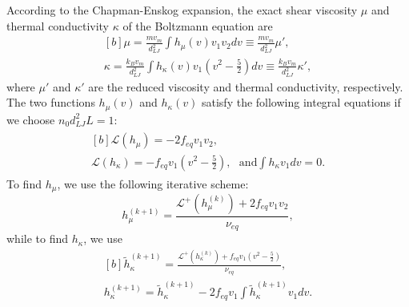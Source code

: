 According to the Chapman-Enskog expansion, the exact shear viscosity $\mu$ and thermal conductivity $\kappa$ of the Boltzmann equation are 
\begin{equation}
\begin{aligned}[b]
\mu=\frac{mv_m}{d_{LJ}^2}\int h_\mu(v)v_1v_2dv\equiv\frac{mv_m}{d_{LJ}^2}\mu',\\
\kappa=\frac{k_Bv_m}{d_{LJ}^2}\int h_\kappa(v)v_1\left(v^2-\frac{5}{2}\right)dv\equiv\frac{k_Bv_m}{d_{LJ}^2}\kappa',
\end{aligned}
\end{equation}
where $\mu'$ and $\kappa'$ are the reduced viscosity and thermal conductivity, respectively. The two functions $h_\mu(v)$ and $h_\kappa(v)$ satisfy the following integral equations if we choose $n_0d_{LJ}^2L=1$:
\begin{eqnarray}\label{transport}
\begin{aligned}[b]
\mathcal{L}(h_\mu)=-2f_{eq}v_
1v_2,\\
\mathcal{L}(h_\kappa)=-f_{eq}v_1\left(v^2-\frac{5}{2}\right), \ \ \ \text{and} \int h_\kappa v_1dv=0.
\end{aligned}
\end{eqnarray}
To find $h_\mu$, we use the following iterative scheme:
\begin{equation}\label{iteration_thermal}
h_\mu^{(k+1)}=\frac{\mathcal{L}^+(h_\mu^{(k)})+2f_{eq}v_1v_2}{\nu_{eq}},
\end{equation} 
while to find $h_\kappa$, we use
\begin{equation}\label{iteration_thermal2}
\begin{aligned}[b]
\widetilde{h}_\kappa^{(k+1)}=\frac{\mathcal{L}^+(h_\kappa^{(k)})+f_{eq}v_1\left(v^2-\frac{5}{2}\right)}{\nu_{eq}},\\
{h}_\kappa^{(k+1)}=\widetilde{h}_\kappa^{(k+1)}-2f_{eq}v_1{\int \widetilde{h}_\kappa^{(k+1)} v_1 dv}.
\end{aligned}
\end{equation} 
